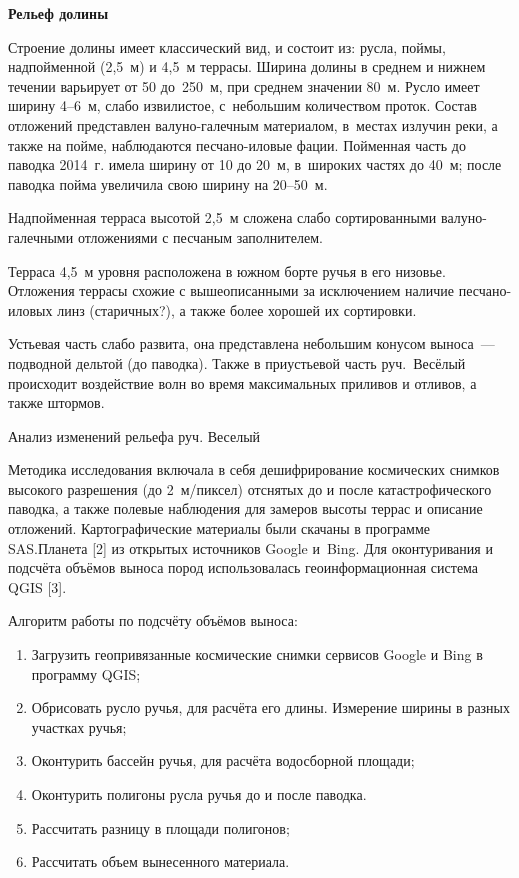 \textbf{Рельеф долины}

Строение долины имеет классический вид, и состоит из: русла, поймы, надпойменной (2,5~м) и 4,5~м террасы. Ширина долины в среднем и нижнем течении варьирует от 50 до~250~м, при среднем значении 80~м. Русло имеет ширину 4--6~м, слабо извилистое, с~небольшим количеством проток. Состав отложений представлен валуно-галечным материалом, в~местах излучин реки, а также на пойме, наблюдаются песчано-иловые фации. Пойменная часть до паводка 2014~г. имела ширину от 10 до 20~м, в широких частях до 40~м; после паводка пойма увеличила свою ширину на 20--50~м.

Надпойменная терраса высотой 2,5~м сложена слабо сортированными валуно-галечными отложениями с песчаным заполнителем.

Терраса 4,5~м уровня расположена в южном борте ручья в его низовье. Отложения террасы схожие с вышеописанными за исключением наличие песчано-иловых линз (старичных?), а также более хорошей их сортировки.

Устьевая часть слабо развита, она представлена небольшим конусом выноса~--- подводной дельтой (до паводка). Также в приустьевой часть руч.~Весёлый происходит воздействие волн во время максимальных приливов и отливов, а также штормов.

Анализ изменений рельефа руч. Веселый

Методика исследования включала в себя дешифрирование космических снимков высокого разрешения (до 2 м/пиксел) отснятых до и после катастрофического паводка, а также полевые наблюдения для замеров высоты террас и описание отложений. Картографические материалы были скачаны в программе SAS.Планета [2] из открытых источников Google и~Bing. Для оконтуривания и подсчёта объёмов выноса пород использовалась геоинформационная система QGIS [3].

Алгоритм работы по подсчёту объёмов выноса:
\begin{enumerate}[noitemsep]\vspace{-8pt}
  \item Загрузить геопривязанные космические снимки сервисов Google и Bing в программу QGIS;
  \item Обрисовать русло ручья, для расчёта его длины. Измерение ширины в разных участках ручья;
  \item Оконтурить бассейн ручья, для расчёта водосборной площади;
  \item Оконтурить полигоны русла ручья до и после паводка.
  \item Рассчитать разницу в площади полигонов;
  \item Рассчитать объем вынесенного материала.
\end{enumerate}\vspace{-8pt}

